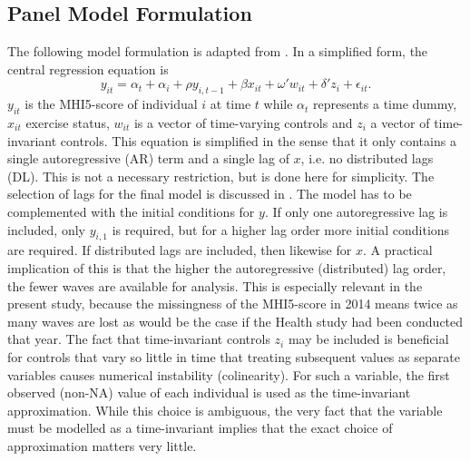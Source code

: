\subsection{Panel Model Formulation}
\label{sec:methods:model_formulation}
The following model formulation is adapted from .
In a simplified form, the central regression equation is
\begin{equation}
    \label{eq:methods:model_formulation}
    y_{it} = \alpha_t + \alpha_i + \rho y_{i,t-1} + \beta x_{it} + \omega' w_{it} + \delta' z_i + \epsilon_{it}.
\end{equation}
$y_{it}$ is the MHI5-score of individual $i$ at time $t$ while $\alpha_t$ represents a time dummy,
$x_{it}$ exercise status, $w_{it}$ is a vector of time-varying controls and $z_i$ a vector of time-invariant controls.
This equation is simplified in the sense that it only contains a single autoregressive (AR) term and a single lag of $x$,
i.e. no distributed lags (DL). This is not a necessary restriction, but is done here for simplicity.
The selection of lags for the final model is discussed in . The model has to be complemented
with the initial conditions for $y$. If only one autoregressive lag is included, only $y_{i,1}$ is required,
but for a higher lag order more initial conditions are required. If distributed lags are included, then likewise for $x$.
A practical implication of this is that the higher the autoregressive (distributed) lag order, the fewer waves
are available for analysis. This is especially relevant in the present study, because the missingness of the MHI5-score
in 2014 means twice as many waves are lost as would be the case if the Health study had been conducted that year.
The fact that time-invariant controls $z_i$ may be included is beneficial for controls that vary so little in time that
treating subsequent values as separate variables causes numerical instability (colinearity). For such a variable,
the first observed (non-NA) value of each individual is used as the time-invariant approximation. While this choice
is ambiguous, the very fact that the variable must be modelled as a time-invariant implies that the exact
choice of approximation matters very little.

